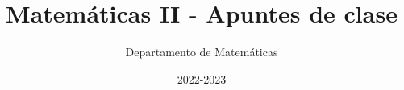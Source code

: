 \documentclass[nobuilddate]{Docencia}
\title{Matemáticas II - Apuntes de clase}
\author{Departamento de Matemáticas}
\date{2022-2023}
\begin{document}
\pagestyle{plain}
\maketitle
\tableofcontents
\newpage

\newcommand{\hide}[1]{#1}

\renewcommand{\vec}[1]{\overrightarrow{#1}}



    
    

    




%
%



%

\newpage
\printindex
\listoffigures
\listoftables
\end{document}
